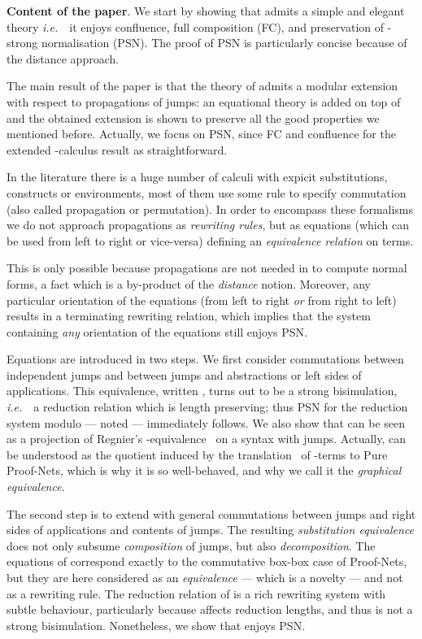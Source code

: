 \documentclass{LMCS}
\newcommand{\ie}{{\it  i.e.}~}
\renewcommand{\>}{\rightarrow}
\newcommand{\deft}[1]{{\bf #1}}
\begin{document}
\deft{Content of the paper}.
We start by showing that  admits a simple and elegant
theory \ie\  it enjoys  confluence, full composition (FC), and preservation of
-strong normalisation (PSN). The proof of PSN is particularly
concise because of the distance approach.

The main result of the paper is that the theory of  admits a
modular extension with respect to propagations of jumps:
an equational theory is added on top
of  and the obtained extension is  shown to
preserve all the good properties we mentioned
  before. Actually, we focus on PSN, since FC and confluence for the
extended -calculus result as straightforward.

In the literature there is a huge number of calculi with expicit
substitutions,  constructs or environments, most of them
use some rule to specify commutation (also called
propagation or permutation). In order to encompass these formalisms we
do not approach propagations as \textit{rewriting rules}, but as
equations (which can be used from left to right or vice-versa)
  defining an \textit{equivalence relation}  on terms.

This is only possible because propagations are
not needed in  to compute normal forms, a fact which is a by-product
of the
  \textit{distance} notion.  Moreover, any particular orientation
of the equations (from left to
  right \textit{or} from right to left) results in a terminating
rewriting relation, which implies that the system containing \textit{any} orientation of the 
equations still enjoys PSN.

Equations are introduced in two steps.  We first consider commutations
between independent jumps
and between jumps and  abstractions or left sides of applications. 
This equivalence, written , turns out to be a strong
bisimulation, \ie\ a 
reduction  relation
which is length preserving; thus PSN
for the reduction system  modulo  --- noted  --- immediately follows. We also
show that  can be seen as a projection of Regnier's
-equivalence~\cite{regnier94} on a syntax with
jumps. Actually,  can be understood as the quotient induced by
the translation~\cite{AccattoliTh} of -terms to Pure
Proof-Nets, which is why it is so well-behaved, and why we call it the
\textit{graphical equivalence}.


The second step is to extend  with general commutations between
jumps and right sides of applications and
contents of jumps.  
 The resulting \textit{substitution equivalence } does not
  only subsume \textit{composition} of jumps, but also
  \textit{decomposition}.  The equations of  correspond
  exactly to the commutative box-box case of Proof-Nets, but they are
  here considered as an \textit{equivalence} --- which is a novelty ---
  and not as a rewriting rule. The reduction relation of  is a
  rich rewriting system with subtle behaviour, particularly because
   affects reduction lengths, and thus is not a strong
  bisimulation. Nonetheless, we show that  enjoys PSN.
\end{document}
